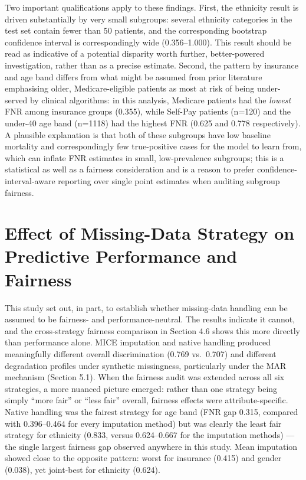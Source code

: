 \documentclass[12pt,a4paper]{report}
\begin{document}
Two important qualifications apply to these findings. First, the ethnicity result is driven substantially by very small subgroups: several ethnicity categories in the test set contain fewer than 50 patients, and the corresponding bootstrap confidence interval is correspondingly wide (0.356--1.000). This result should be read as indicative of a potential disparity worth further, better-powered investigation, rather than as a precise estimate. Second, the pattern by insurance and age band differs from what might be assumed from prior literature emphasising older, Medicare-eligible patients as most at risk of being under-served by clinical algorithms: in this analysis, Medicare patients had the \emph{lowest} FNR among insurance groups (0.355), while Self-Pay patients (n=120) and the under-40 age band (n=1118) had the highest FNR (0.625 and 0.778 respectively). A plausible explanation is that both of these subgroups have low baseline mortality and correspondingly few true-positive cases for the model to learn from, which can inflate FNR estimates in small, low-prevalence subgroups; this is a statistical as well as a fairness consideration and is a reason to prefer confidence-interval-aware reporting over single point estimates when auditing subgroup fairness.


\section{Effect of Missing-Data Strategy on Predictive Performance and Fairness}
This study set out, in part, to establish whether missing-data handling can be assumed to be fairness- and performance-neutral. The results indicate it cannot, and the cross-strategy fairness comparison in Section 4.6 shows this more directly than performance alone. MICE imputation and native handling produced meaningfully different overall discrimination (0.769 vs.\ 0.707) and different degradation profiles under synthetic missingness, particularly under the MAR mechanism (Section 5.1). When the fairness audit was extended across all six strategies, a more nuanced picture emerged: rather than one strategy being simply ``more fair'' or ``less fair'' overall, fairness effects were attribute-specific. Native handling was the fairest strategy for age band (FNR gap 0.315, compared with 0.396--0.464 for every imputation method) but was clearly the least fair strategy for ethnicity (0.833, versus 0.624--0.667 for the imputation methods) --- the single largest fairness gap observed anywhere in this study. Mean imputation showed close to the opposite pattern: worst for insurance (0.415) and gender (0.038), yet joint-best for ethnicity (0.624).
\end{document}
